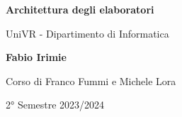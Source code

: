 \begin{titlepage}
	\begin{center}
		\vspace*{1cm}

		\Huge
		\textbf{Architettura degli elaboratori}

		\vspace{0.5cm}
		\LARGE
		UniVR - Dipartimento di Informatica

		\vspace{1.5cm}

		\textbf{Fabio Irimie}

		\vfill


		\vspace{0.8cm}

    Corso di Franco Fummi e Michele Lora

		2° Semestre 2023/2024

	\end{center}
\end{titlepage}
